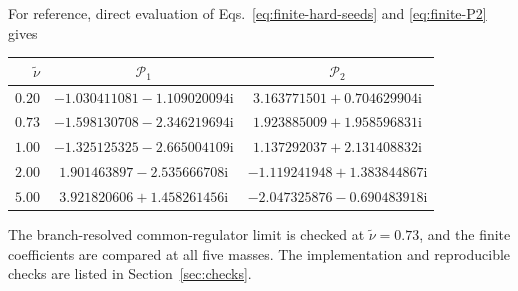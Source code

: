 \documentclass[a4paper,12pt]{article}
\newcommand{\ii}{\mathrm i}
\newcommand{\tn}{\tilde\nu}
\begin{document}
For reference, direct evaluation of Eqs.~\eqref{eq:finite-hard-seeds}
and \eqref{eq:finite-P2} gives
\begin{center}
\begin{tabular}{rcc}
\toprule
$\tn$ & $\mathcal P_1$ & $\mathcal P_2$\\\midrule
$0.20$ & $-1.030411081-1.109020094\ii$ & $3.163771501+0.704629904\ii$\\
$0.73$ & $-1.598130708-2.346219694\ii$ & $1.923885009+1.958596831\ii$\\
$1.00$ & $-1.325125325-2.665004109\ii$ & $1.137292037+2.131408832\ii$\\
$2.00$ & $1.901463897-2.535666708\ii$ & $-1.119241948+1.383844867\ii$\\
$5.00$ & $3.921820606+1.458261456\ii$ & $-2.047325876-0.690483918\ii$\\\bottomrule
\end{tabular}
\end{center}
The branch-resolved common-regulator limit is checked at $\tn=0.73$,
and the finite coefficients are compared at all five masses.
The implementation and reproducible checks are listed in
Section~\ref{sec:checks}.
\end{document}
